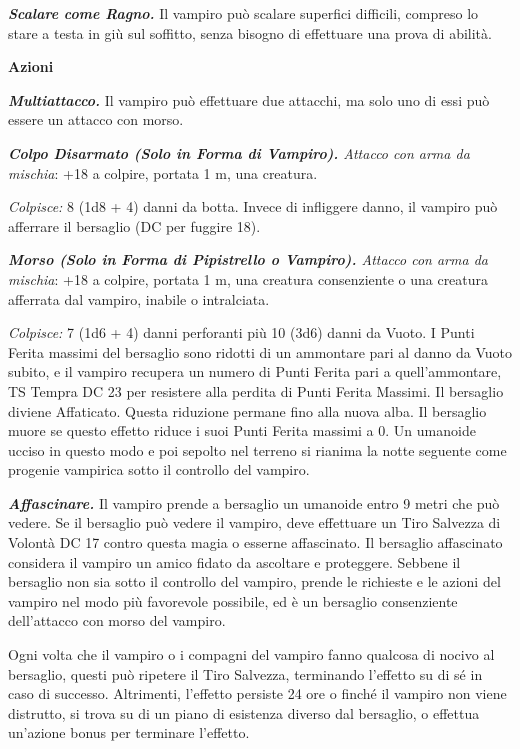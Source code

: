 \begin{multicols}{2}
\textit{\textbf{Scalare come Ragno.}} Il vampiro può scalare superfici difficili, compreso lo stare a testa in giù sul soffitto, senza bisogno di effettuare una prova di abilità.

\textbf{Azioni}

\textit{\textbf{Multiattacco.}} Il vampiro può effettuare due attacchi, ma solo uno di essi può essere un attacco con morso.

\textit{\textbf{Colpo Disarmato (Solo in Forma di Vampiro).} Attacco con arma da mischia}: +18 a colpire, portata 1 m, una creatura.

\textit{Colpisce:} 8 (1d8 + 4) danni da botta. Invece di infliggere danno, il vampiro può afferrare il bersaglio (DC per fuggire 18).

\textit{\textbf{Morso (Solo in Forma di Pipistrello o Vampiro).} Attacco con arma da mischia}: +18 a colpire, portata 1 m, una creatura consenziente o una creatura afferrata dal vampiro, inabile o intralciata.

\textit{Colpisce:} 7 (1d6 + 4) danni perforanti più 10 (3d6) danni da Vuoto. I Punti Ferita massimi del bersaglio sono ridotti di un ammontare pari al danno da Vuoto subito, e il vampiro recupera un numero di Punti Ferita pari a quell'ammontare, TS Tempra DC 23 per resistere alla perdita di Punti Ferita Massimi. Il bersaglio diviene Affaticato. Questa riduzione permane fino alla nuova alba. Il bersaglio muore se questo effetto riduce i suoi Punti Ferita massimi a 0. Un umanoide ucciso in questo modo e poi sepolto nel terreno si rianima la notte seguente come progenie vampirica sotto il controllo del vampiro.

\textit{\textbf{Affascinare.}} Il vampiro prende a bersaglio un umanoide entro 9 metri che può vedere. Se il bersaglio può vedere il vampiro, deve effettuare un Tiro Salvezza di Volontà DC 17 contro questa magia o esserne affascinato. Il bersaglio affascinato considera il vampiro un amico fidato da ascoltare e proteggere. Sebbene il bersaglio non sia sotto il controllo del vampiro, prende le richieste e le azioni del vampiro nel modo più favorevole possibile, ed è un bersaglio consenziente dell'attacco con morso del vampiro.

Ogni volta che il vampiro o i compagni del vampiro fanno qualcosa di nocivo al bersaglio, questi può ripetere il Tiro Salvezza, terminando l'effetto su di sé in caso di successo. Altrimenti, l'effetto persiste 24 ore o finché il vampiro non viene distrutto, si trova su di un piano di esistenza diverso dal bersaglio, o effettua un'azione bonus per terminare l'effetto.


\end{multicols}
